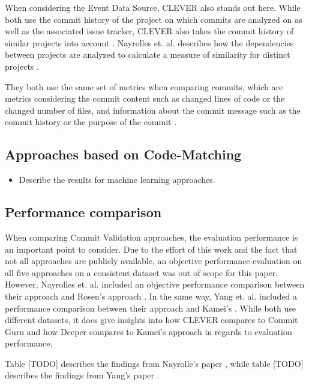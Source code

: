 When considering the Event Data Source, CLEVER also stands out here. While both use the commit history of the project on which commits are analyzed on as well as the associated issue tracker, CLEVER also takes the commit history of similar projects into account \cite{Nayrolles2018, Yang2015}. Nayrolles et. al. describes how the dependencies between projects are analyzed to calculate a measure of similarity for distinct projects \cite{Nayrolles2018}.


They both use the same set of metrics when comparing commits, which are metrics considering the commit content such as changed lines of code or the changed number of files, and information about the 
commit message %
such as the commit history or the purpose of the commit \cite{Nayrolles2018, Yang2015}.

\subsection{Approaches based on Code-Matching}
\begin{itemize}
\item Describe the results for machine learning approaches.
\end{itemize}

\subsection{Performance comparison}

When comparing Commit Validation approaches, the evaluation performance is an important point to consider. Due to the effort of this work and the fact that not all approaches are publicly available, an objective performance evaluation on all five approaches on a consistent dataset was out of scope for this paper. However, Nayrolles et. al. included an objective performance comparison between their approach and Rosen's approach \cite{Nayrolles2018}. In the same 
way, %
Yang et. al. included a performance comparison between their approach and Kamei's \cite{Yang2015}. While both use different datasets, it does give insights into how CLEVER compares to Commit Guru and how Deeper compares to Kamei's approach in regards to evaluation performance.

Table [TODO] describes the findings from Nayrolle's paper \cite{Nayrolles2018}, while table [TODO] describes the findings from Yang's paper \cite{Yang2015}.

